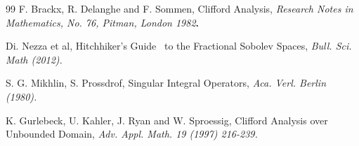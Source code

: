 \documentclass{amsart}%
\theoremstyle{plain}
\numberwithin{equation}{section}
\begin{document}
\begin{thebibliography}{99}
F. Brackx, R. Delanghe and F. Sommen, Clifford Analysis,
\textit{Research Notes in Mathematics, No. 76, Pitman, London 1982}\textbf{.}

Di. Nezza et al, Hitchhiker's Guide \ to the
Fractional Sobolev Spaces, \textit{Bull. Sci. Math (2012).}

S. G. Mikhlin, S. Prossdrof, Singular Integral
Operators, \textit{Aca. Verl. Berlin (1980).}

K. Gurlebeck, U. Kahler, J. Ryan and W. Sproessig,
Clifford Analysis over Unbounded Domain, \textit{Adv. Appl. Math. 19 (1997)
216-239.}
\end{thebibliography}
\end{document}
